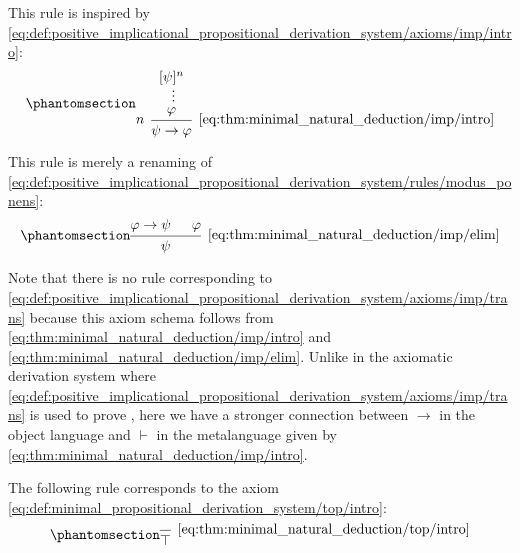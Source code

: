\begin{proposition}
\begin{thmenum}
    \begin{minipage}[t]{0.45\textwidth}
      This rule is inspired by \eqref{eq:def:positive_implicational_propositional_derivation_system/axioms/imp/intro}:
      \begin{equation*}\taglabel[\textrm{R} \( \rightarrow^+ \)]{eq:thm:minimal_natural_deduction/imp/intro}
        \begin{prooftree}
          \hypo{ [\psi]^n }
          \ellipsis {} { \varphi }
          \infer[left label=\( n \)]1[\ref{eq:thm:minimal_natural_deduction/imp/intro}]{ \psi \rightarrow \varphi }
        \end{prooftree}
      \end{equation*}
    \end{minipage}
    \hfill
    \begin{minipage}[t]{0.45\textwidth}
      This rule is merely a renaming of \eqref{eq:def:positive_implicational_propositional_derivation_system/rules/modus_ponens}:
      \begin{equation*}\taglabel[\textrm{R} \( \rightarrow^- \)]{eq:thm:minimal_natural_deduction/imp/elim}
        \begin{prooftree}
          \hypo{ \varphi \rightarrow \psi }
          \hypo{ \varphi }
          \infer2[\ref{eq:thm:minimal_natural_deduction/imp/elim}]{ \psi }
        \end{prooftree}
      \end{equation*}
    \end{minipage}

    Note that there is no rule corresponding to \eqref{eq:def:positive_implicational_propositional_derivation_system/axioms/imp/trans} because this axiom schema follows from \eqref{eq:thm:minimal_natural_deduction/imp/intro} and \eqref{eq:thm:minimal_natural_deduction/imp/elim}. Unlike in the axiomatic derivation system where \eqref{eq:def:positive_implicational_propositional_derivation_system/axioms/imp/trans} is used to prove , here we have a stronger connection between \( \rightarrow \) in the object language and \( \vdash \) in the metalanguage given by \eqref{eq:thm:minimal_natural_deduction/imp/intro}.

     The following rule corresponds to the axiom \eqref{eq:def:minimal_propositional_derivation_system/top/intro}:
    \begin{equation*}\taglabel[\textrm{R} \( \top^+ \)]{eq:thm:minimal_natural_deduction/top/intro}
      \begin{prooftree}
        \infer0[\ref{eq:thm:minimal_natural_deduction/top/intro}]{ \top }
      \end{prooftree}
    \end{equation*}


\end{thmenum}
\end{proposition}
